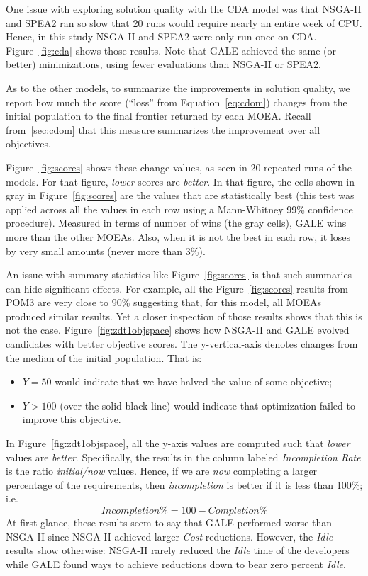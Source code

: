 \documentclass[10pt,journal,compsoc]{IEEEtran}
\newcommand{\eq}[1]{Equation~\ref{eq:#1}}
\newcommand{\bi}{\begin{itemize}}
\newcommand{\ei}{\end{itemize}}
\newcommand{\tion}[1]{\textsection\ref{sec:#1}}
\newcommand{\fig}[1]{Figure~\ref{fig:#1}}
\begin{document}
One issue with exploring solution quality
with the CDA model was that NSGA-II and SPEA2 ran so slow that 20 runs would 
require nearly an entire week of CPU.
Hence, in this study NSGA-II and SPEA2 were
only run once on CDA.  \fig{cda} shows those results.
Note that GALE achieved the same (or better) minimizations, using  fewer evaluations than NSGA-II or SPEA2. 


As to the other models,
to summarize the improvements in solution quality, we report how much
the score (``loss'' from \eq{cdom}) changes from the initial population to the final frontier
returned by each MOEA.  Recall from~\tion{cdom} that this measure summarizes the
improvement over all objectives.

\fig{scores} shows these change values,
as seen in 20 repeated runs of the models. 
For that figure, {\em lower} scores are {\em better}.
In that figure, the cells shown in gray in \fig{scores}
are the values
that are statistically best (this test was applied across
all the values in each row using a Mann-Whitney 99\% confidence procedure).
Measured in terms of number of wins (the gray cells), GALE wins more
than the other MOEAs. Also, when it is not the best in each row,
it loses by very small amounts (never more than 3\%).







An issue with summary statistics
like \fig{scores}  is that such summaries can hide significant effects.
For example, all the \fig{scores} results from POM3 are very close to 90\%
suggesting that, for this model, all MOEAs produced similar
results.
Yet a closer inspection of those results shows that this is not the case.
\fig{zdt1objspace} shows how NSGA-II and GALE evolved candidates
with better objective scores.  
The y-vertical-axis denotes
changes from the median of the initial population.
 That is:
\bi
\item $Y=50$ would indicate that we have halved the value of some objective;
\item $Y \gt 100$ (over the solid black line) would indicate that optimization failed to improve this objective.
\ei
In \fig{zdt1objspace}, all 
the y-axis values are computed such that {\em lower}
values are {\em better}. Specifically, the results in the column
labeled {\em Incompletion Rate}
is the ratio {\em initial/now} values. Hence, if we are {\em now} completing a larger
percentage of the requirements, then {\em incompletion} is better if it is
less than 100\%; i.e. \[\mathit{Incompletion}\% = 100 - \mathit{Completion}\%\]
At first glance, these results seem to say that GALE
performed worse than NSGA-II since NSGA-II achieved larger
{\em Cost} reductions. However, the {\em Idle}
results  show otherwise:
 NSGA-II rarely reduced
the {\em Idle} time of the developers  while GALE
found ways to achieve reductions down to bear zero percent {\em Idle}.
\end{document}
